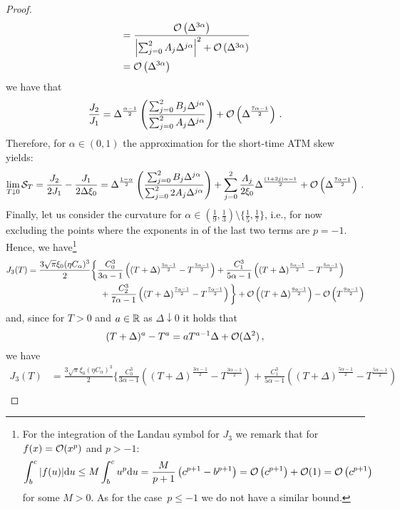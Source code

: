 \begin{proof}
\begin{align*}
    &= \frac{\mathcal{O}\left(\Delta^{3\alpha}\right)}{\left|\sum_{j=0}^2 A_j \Delta^{j\alpha}\right|^2 + \mathcal{O}\left(\Delta^{3\alpha}\right)} \\
    & = \mathcal{O}\left(\Delta^{3\alpha}\right)
\end{align*}
we have that
\begin{equation*}
    \frac{J_2}{J_1} = \Delta^{\frac{\alpha-1}2} \left(\frac{\sum_{j=0}^2 B_j \Delta^{j\alpha}}{\sum_{j=0}^2 A_j \Delta^{j\alpha}}\right) + \mathcal{O}\left(\Delta^{\frac{7\alpha - 1}{2}}\right)\,.
\end{equation*}
Therefore, for $\alpha\in(0,1)$ the approximation for the short-time ATM skew yields:  
\begin{align*}
    \lim _{T \downarrow 0} \mathcal{S}_T = \frac{J_2}{2J_1} - \frac{J_1}{2\Delta\xi_0} = \Delta^{\frac{1-\alpha}2} \left(\frac{\sum_{j=0}^2 B_j \Delta^{j\alpha}}{\sum_{j=0}^2 2A_j \Delta^{j\alpha}}\right) + \sum_{j=0}^2 \frac{A_j}{2\xi_0} \Delta^{\frac{(1+2j)\alpha-1}{2}} + \mathcal{O}\left(\Delta^{\frac{7\alpha - 1}{2}}\right)\,.
\end{align*}
Finally, let us consider the curvature for $\alpha\in\left(\frac{1}{9}, \frac{1}{3}\right)\setminus\{\frac15, \frac17\}$, i.e., for now excluding the points where the exponents in of the last two terms are $p=-1$. Hence, we have\footnote{For the integration of the Landau symbol for $J_3$ we remark that for $f(x)=\mathcal{O}(x^p)$ and $p > -1$:
$$\int_b^c|f(u)| \mathrm{d} u \leq M \int_b^c u^p \mathrm{d} u = \frac{M}{p+1}\left(c^{p+1}-b^{p+1}\right)=\mathcal{O}\left(c^{p+1}\right)+\mathcal{O}(1)=\mathcal{O}\left(c^{p+1}\right)$$
\indent for some $M>0$. As for the case~$p\leq -1$ we do not have a similar bound.}
\begin{align*}
     J_3(T) &= \frac{3\sqrt{\pi}\xi_0(\eta C_{\alpha})^3}{2} \bigg\{\frac{C_0^3}{3\alpha-1} \left( (T+\Delta)^{\frac{3\alpha - 1}{2}} - T^{\frac{3\alpha - 1}{2}} \right) + \frac{C_1^3}{5\alpha-1} \left( (T+\Delta)^{\frac{5\alpha - 1}{2}} - T^{\frac{5\alpha - 1}{2}} \right) \\
    & \hspace{3cm} + \frac{C_2^3}{7\alpha-1} \left( (T+\Delta)^{\frac{7\alpha - 1}{2}} - T^{\frac{7\alpha - 1}{2}} \right) \bigg\} + \Oo\left((T+\Delta)^{\frac{9\alpha - 1}{2}}\right)-\Oo\left(T^{\frac{9\alpha - 1}{2}}\right)
\end{align*}
and, since for $T>0$ and $a\in\mathbb{R}$ as $\Delta\downarrow 0$ it holds that
\[
(T+\Delta)^{a} - T^a = a T^{a-1} \Delta + \mathcal{O}(\Delta^2)\,,
\]
we have
\begin{align*}
     J_3(T) &= \frac{3\sqrt{\pi}\xi_0(\eta C_{\alpha})^3}{2} \bigg\{\frac{C_0^3}{3\alpha-1} \left( (T+\Delta)^{\frac{3\alpha - 1}{2}} - T^{\frac{3\alpha - 1}{2}} \right) + \frac{C_1^3}{5\alpha-1} \left( (T+\Delta)^{\frac{5\alpha - 1}{2}} - T^{\frac{5\alpha - 1}{2}} \right) \\

\end{align*}
\end{proof}
